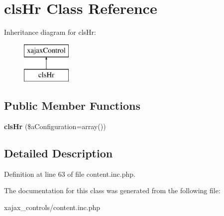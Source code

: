 \hypertarget{classclsHr}{
\section{clsHr Class Reference}
\label{classclsHr}
}
Inheritance diagram for clsHr:\begin{figure}[H]
\begin{center}
\leavevmode
\includegraphics[height=2.000000cm]{classclsHr}
\end{center}
\end{figure}
\subsection*{Public Member Functions}
\begin{DoxyCompactItemize}
\item 
\hypertarget{classclsHr_a5e93df21b5a4663017a8d4bb4c9d3972}{
{\bfseries clsHr} (\$aConfiguration=array())}
\label{classclsHr_a5e93df21b5a4663017a8d4bb4c9d3972}

\end{DoxyCompactItemize}


\subsection{Detailed Description}


Definition at line 63 of file content.inc.php.



The documentation for this class was generated from the following file:\begin{DoxyCompactItemize}
\item 
xajax\_\-controls/content.inc.php\end{DoxyCompactItemize}
